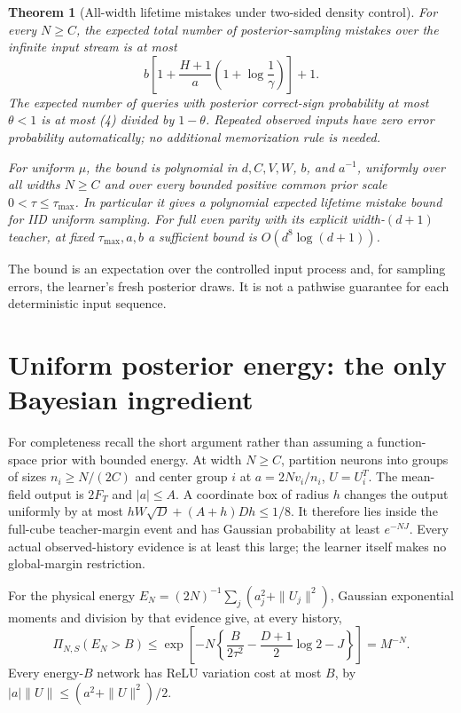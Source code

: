 \documentclass[11pt]{article}
\newtheorem{theorem}{Theorem}\newtheorem{lemma}[theorem]{Lemma}
\begin{document}
\begin{theorem}[All-width lifetime mistakes under two-sided density control]
For every $N\ge C$, the expected total number of posterior-sampling
mistakes over the infinite input stream is at most
\[
 \boxed{\quad
 b\left[1+\frac{H+1}{a}\left(1+\log\frac1\gamma\right)\right]+1.
 \quad}                                                  \tag{4}
\]
The expected number of queries with posterior correct-sign probability
at most $\theta<1$ is at most (4) divided by $1-\theta$.
Repeated observed inputs have zero error probability automatically;
no additional memorization rule is needed.

For uniform $\mu$, the bound is polynomial in $d,C,V,W$, $b$, and
$a^{-1}$, uniformly over all widths $N\ge C$ and over every bounded
positive common prior scale $0<\tau\le\tau_{\max}$. In particular it
gives a polynomial expected lifetime mistake bound for IID uniform
sampling. For full even parity with its explicit width-$(d+1)$ teacher,
at fixed $\tau_{\max},a,b$ a sufficient bound is $O(d^8\log(d+1))$.
\end{theorem}
The bound is an expectation over the controlled input process and, for
sampling errors, the learner's fresh posterior draws. It is not a
pathwise guarantee for each deterministic input sequence.

\section{Uniform posterior energy: the only Bayesian ingredient}
For completeness recall the short argument rather than assuming a
function-space prior with bounded energy. At width $N\ge C$, partition
neurons into groups of sizes $n_i\ge N/(2C)$ and center group $i$ at
$a=2Nv_i/n_i$, $U=U_i^T$. The mean-field output is $2F_T$ and
$|a|\le A$. A coordinate box of radius $h$ changes the output uniformly
by at most
$hW\sqrt D+(A+h)Dh\le1/8$. It therefore lies inside the full-cube
teacher-margin event and has Gaussian probability at least $e^{-NJ}$.
Every actual observed-history evidence is at least this large; the
learner itself makes no global-margin restriction.

For the physical energy
$E_N=(2N)^{-1}\sum_j(a_j^2+\|U_j\|^2)$, Gaussian exponential moments
and division by that evidence give, at every history,
\[
 \Pi_{N,S}(E_N>B)
 \le\exp\left[-N\left\{\frac B{2\tau^2}
                  -\frac{D+1}{2}\log2-J\right\}\right]
 =M^{-N}.                                                \tag{5}
\]
Every energy-$B$ network has ReLU variation cost at most $B$, by
$|a|\|U\|\le(a^2+\|U\|^2)/2$.
\end{document}
